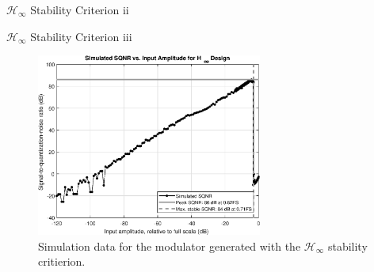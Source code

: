 \documentclass[10pt,usenames,dvipsnames]{beamer}
\begin{document}
{\begin{frame}{$\mathcal{H}_\infty$ Stability Criterion ii}
\end{frame}

\begin{frame}{$\mathcal{H}_\infty$ Stability Criterion iii}

\begin{figure}
	\centering
	\includegraphics[height=6cm]{sqnr-hinf}
	\caption{Simulation data for the modulator generated with the $\mathcal{H}_\infty$ stability critierion.}
\end{figure}

\end{frame}
}
\end{document}
